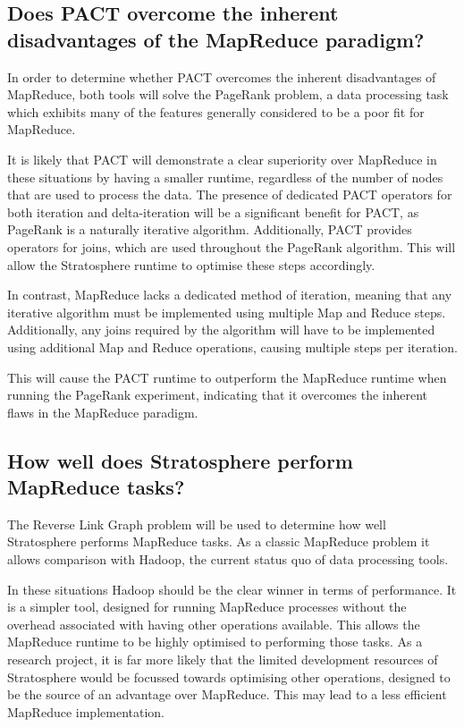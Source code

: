 \tocless\subsection{Does PACT overcome the inherent disadvantages of the MapReduce paradigm?}
In order to determine whether PACT overcomes the inherent disadvantages of MapReduce, both tools will solve the PageRank problem, a data processing task which exhibits many of the features generally considered to be a poor fit for MapReduce.

It is likely that PACT will demonstrate a clear superiority over MapReduce in these situations by having a smaller runtime, regardless of the number of nodes that are used to process the data. The presence of dedicated PACT operators for both iteration and delta-iteration will be a significant benefit for PACT, as PageRank is a naturally iterative algorithm. Additionally, PACT provides operators for joins, which are used throughout the PageRank algorithm. This will allow the Stratosphere runtime to optimise these steps accordingly.

In contrast, MapReduce lacks a dedicated method of iteration, meaning that any iterative algorithm must be implemented using multiple Map and Reduce steps. Additionally, any joins required by the algorithm will have to be implemented using additional Map and Reduce operations, causing multiple steps per iteration.

This will cause the PACT runtime to outperform the MapReduce runtime when running the PageRank experiment, indicating that it overcomes the inherent flaws in the MapReduce paradigm.

\tocless\subsection{How well does Stratosphere perform MapReduce tasks?}
The Reverse Link Graph problem will be used to determine how well Stratosphere performs MapReduce tasks. As a classic MapReduce problem it allows comparison with Hadoop, the current status quo of data processing tools.

In these situations Hadoop should be the clear winner in terms of performance. It is a simpler tool, designed for running MapReduce processes without the overhead associated with having other operations available. This allows the MapReduce runtime to be highly optimised to performing those tasks. As a research project, it is far more likely that the limited development resources of Stratosphere would be focussed towards optimising other operations, designed to be the source of an advantage over MapReduce. This may lead to a less efficient MapReduce implementation. 

